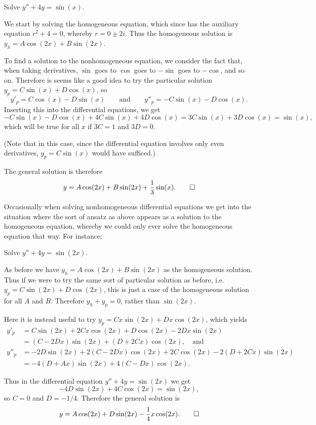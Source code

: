 \begin{example}
	Solve $y'' + 4 y = \sin(x)$.

	We start by solving the homogeneous equation, which since has the auxiliary equation $r^2 + 4 = 0$, whereby $r = 0 \pm 2 i$.
	Thus the homogeneous solution is $y_h = A \cos(2 x) + B \sin(2 x)$.

	To find a solution to the nonhomogeneous equation, we consider the fact that, when taking derivatives, $\sin$ goes to $\cos$ goes to $-\sin$ goes to $-\cos$, and so on.
	Therefore is seems like a good idea to try the particular solution $y_p = C \sin(x) + D \cos(x)$, so
	\[
		y'_p = C \cos(x) - D \sin(x) \qquad \text{and} \qquad y''_p = - C \sin(x) - D \cos(x).
	\]
	Inserting this into the differential equations, we get
	\[
	- C \sin(x) - D \cos(x) + 4 C \sin(x) + 4 D \cos(x) = 3 C \sin(x) + 3 D \cos(x) = \sin(x),
	\]
	which will be true for all $x$ if $3 C = 1$ and $3 D = 0$.

	(Note that in this case, since the differential equation involves only even derivatives, $y_p = C \sin(x)$ would have sufficed.)

	The general solution is therefore
	\[
		y = A \cos(2 x) + B \sin(2 x) + \frac{1}{3} \sin(x). \qedhere
	\]
\end{example}

\noindent
Occasionally when solving nonhomogeneous differential equations we get into the situation where the sort of ansatz as above appears as a solution to the homogeneous equation, whereby we could only ever solve the homogeneous equation that way. For instance:

\begin{example}
	Solve $y'' + 4 y = \sin(2 x)$.

	As before we have $y_h = A \cos(2 x) + B \sin(2 x)$ as the homogeneous solution.
	Thus if we were to try the same sort of particular solution as before, i.e. $y_p = C \sin(2 x) + D \cos(2 x)$, this is just a case of the homogeneous solution for all $A$ and $B$.
	Therefore $y_h + y_p = 0$, rather than $\sin(2 x)$.

	Here it is instead useful to try $y_p = C x \sin(2 x) + D x \cos(2 x)$, which yields
	\begin{align*}
		y'_p  &= C \sin(2 x) + 2 C x \cos(2 x) + D \cos(2 x) - 2 D x \sin(2 x) \\
		      &= (C - 2 D x) \sin(2 x) + (D + 2 C x) \cos(2 x), \quad \text{and} \\
		y''_p &= -2 D \sin(2 x) + 2 (C - 2 D x) \cos(2 x) + 2 C \cos(2 x) - 2 (D + 2 C x) \sin(2 x) \\
		      &= -4 (D + A x) \sin(2 x) + 4 (C - D x) \cos(2 x).
	\end{align*}

	\noindent
	Thus in the differential equation $y'' + 4 y = \sin(2 x)$ we get
	\[
		-4 D \sin(2 x) + 4 C \cos(2 x) = \sin(2 x),
	\]
	so $C = 0$ and $D = - 1 / 4$. Therefore the general solution is
	\[
		y = A \cos(2 x) + D \sin(2 x) - \frac{1}{4} x \cos(2 x). \qedhere
	\]
\end{example}

